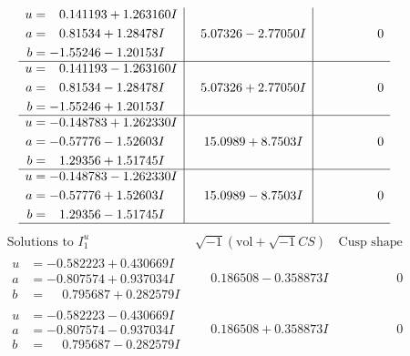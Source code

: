 \documentclass[1p]{elsarticle_modified}
\theoremstyle{definition}
\newcommand{\I}{\sqrt{-1}}
\begin{document}
$$\begin{array}{c|c|c}
\begin{aligned}
u &= \phantom{-}0.141193 + 1.263160 I \\
a &= \phantom{-}0.81534 + 1.28478 I \\
b &= -1.55246 - 1.20153 I\end{aligned}
 & \phantom{-}5.07326 - 2.77050 I & \phantom{-0.000000 } 0 \\ \hline\begin{aligned}
u &= \phantom{-}0.141193 - 1.263160 I \\
a &= \phantom{-}0.81534 - 1.28478 I \\
b &= -1.55246 + 1.20153 I\end{aligned}
 & \phantom{-}5.07326 + 2.77050 I & \phantom{-0.000000 } 0 \\ \hline\begin{aligned}
u &= -0.148783 + 1.262330 I \\
a &= -0.57776 - 1.52603 I \\
b &= \phantom{-}1.29356 + 1.51745 I\end{aligned}
 & \phantom{-}15.0989 + 8.7503 I & \phantom{-0.000000 } 0 \\ \hline\begin{aligned}
u &= -0.148783 - 1.262330 I \\
a &= -0.57776 + 1.52603 I \\
b &= \phantom{-}1.29356 - 1.51745 I\end{aligned}
 & \phantom{-}15.0989 - 8.7503 I & \phantom{-0.000000 } 0\\
 \hline 
 \end{array}$$\newpage$$\begin{array}{c|c|c}  
\text{Solutions to }I^u_{1}& \I (\text{vol} + \sqrt{-1}CS) & \text{Cusp shape}\\
 \hline 
\begin{aligned}
u &= -0.582223 + 0.430669 I \\
a &= -0.807574 + 0.937034 I \\
b &= \phantom{-}0.795687 + 0.282579 I\end{aligned}
 & \phantom{-}0.186508 - 0.358873 I & \phantom{-0.000000 } 0 \\ \hline\begin{aligned}
u &= -0.582223 - 0.430669 I \\
a &= -0.807574 - 0.937034 I \\
b &= \phantom{-}0.795687 - 0.282579 I\end{aligned}
 & \phantom{-}0.186508 + 0.358873 I & \phantom{-0.000000 } 0 \\ \hline\begin{aligned}

\end{aligned}
\end{array}$$
\end{document}
